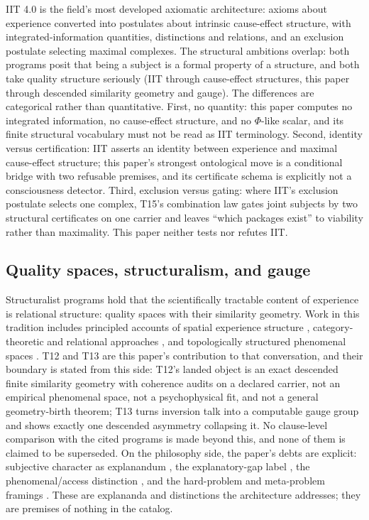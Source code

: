 \documentclass[11pt]{article}
\theoremstyle{definition}
\begin{document}
IIT 4.0 \citep{AlbantakisEtAl2023IIT4} is the field's most developed
axiomatic architecture: axioms about experience converted into postulates
about intrinsic cause-effect structure, with integrated-information
quantities, distinctions and relations, and an exclusion postulate selecting
maximal complexes. The structural ambitions overlap: both programs posit
that being a subject is a formal property of a structure, and both take
quality structure seriously (IIT through cause-effect structures, this paper
through descended similarity geometry and gauge). The differences are
categorical rather than quantitative. First, no quantity: this paper computes
no integrated information, no cause-effect structure, and no
$\Phi$-like scalar, and its finite structural vocabulary must not be read as
IIT terminology. Second, identity versus certification: IIT asserts an
identity between experience and maximal cause-effect structure; this paper's
strongest ontological move is a conditional bridge with two refusable
premises, and its certificate schema is explicitly not a consciousness
detector. Third, exclusion versus gating: where IIT's exclusion postulate
selects one complex, T15's combination law gates joint subjects by two
structural certificates on one carrier and leaves ``which packages exist'' to
viability rather than maximality. This paper neither tests nor refutes IIT.

\subsection{Quality spaces, structuralism, and gauge}

Structuralist programs hold that the scientifically tractable content of
experience is relational structure: quality spaces with their similarity
geometry. Work in this tradition includes principled accounts of spatial
experience structure \citep{HaunTononi2019}, category-theoretic and
relational approaches \citep{TsuchiyaSaigo2021}, and topologically structured
phenomenal spaces \citep{Prentner2019Topological}. T12 and T13 are this
paper's contribution to that conversation, and their boundary is stated from
this side: T12's landed object is an exact descended finite similarity
geometry with coherence audits on a declared carrier, not an empirical
phenomenal space, not a psychophysical fit, and not a general geometry-birth
theorem; T13 turns inversion talk into a computable gauge group and shows
exactly one descended asymmetry collapsing it. No clause-level comparison
with the cited programs is made beyond this, and none of them is claimed to
be superseded. On the philosophy side, the paper's debts are explicit:
subjective character as explanandum \citep{Nagel1974}, the explanatory-gap
label \citep{Levine1983}, the phenomenal/access distinction
\citep{Block1995}, and the hard-problem and meta-problem framings
\citep{Chalmers1995FacingUp, Chalmers2018MetaProblem}. These are explananda
and distinctions the architecture addresses; they are premises of nothing in
the catalog.
\end{document}

